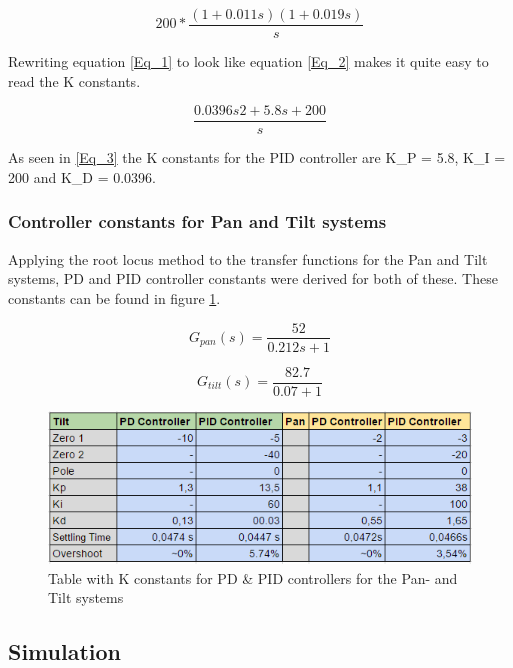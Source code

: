 \begin{equation}
200*\frac{(1+0.011s)(1+0.019s)}{s}
\label{Eq_1} 
\end{equation}

Rewriting equation \ref{Eq_1} to look like equation \ref{Eq_2} makes it quite easy to read the K constants.

\begin{equation}
\frac{0.0396s2 +5.8s+200}{s}
\label{Eq_3}
\end{equation}

As seen in \ref{Eq_3} the K constants for the PID controller are K\_P = 5.8, K\_I = 200 and K\_D = 0.0396.

\subsubsection{Controller constants for Pan and Tilt systems}

Applying the root locus method to the transfer functions for the Pan and Tilt systems, PD and PID controller constants were derived for both of these. These constants can be found in figure \ref{fig:PIDControllerTable}.

\begin{equation}
G_{pan}(s)=\frac{52}{0.212s+1}
\end{equation}

\begin{equation}
G_{tilt}(s)=\frac{82.7}{0.07+1}
\end{equation}

\begin{figure}[h!]
\centering
\includegraphics[scale=0.7]{Billeder/PIDControllerTable.png}
\caption{Table with K constants for PD \& PID controllers for the Pan- and Tilt systems}
\label{fig:PIDControllerTable}
\end{figure}

\subsection{Simulation}

